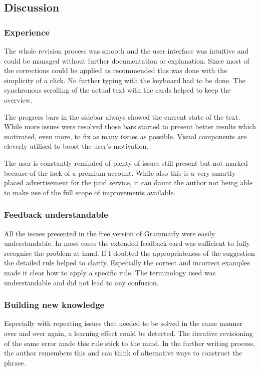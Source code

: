 \documentclass[runningheads]{llncs}
\let\OldTextregistered\textregistered
\renewcommand{\textregistered}{\OldTextregistered\xspace}
\begin{document}
\subsection{Discussion}
\subsubsection{Experience}
The whole revision process was smooth and the user interface was intuitive and could be managed without further documentation or explanation. Since most of the corrections could be applied as recommended this was done with the simplicity of a click. No further typing with the keyboard had to be done. The synchronous scrolling of the actual text with the cards helped to keep the overview.

The progress bars in the sidebar always showed the current state of the text. While more issues were resolved those bars started to present better results which motivated, even more, to fix as many issues as possible. Visual components are cleverly utilised to boost the user's motivation.

The user is constantly reminded of plenty of issues still present but not marked because of the lack of a premium account. While also this is a very smartly placed advertisement for the paid service, it can daunt the author not being able to make use of the full scope of improvements available.

\subsubsection{Feedback understandable}
All the issues presented in the free version of Grammarly\textregistered were easily understandable. In most cases the extended feedback card was sufficient to fully recognise the problem at hand. If I doubted the appropriateness of the suggestion the detailed rule helped to clarify. Especially the correct and incorrect examples made it clear how to apply a specific rule. The terminology used was understandable and did not lead to any confusion.

\subsubsection{Building new knowledge}
Especially with repeating issues that needed to be solved in the same manner over and over again, a learning effect could be detected. The iterative revisioning of the same error made this rule stick to the mind. In the further writing process, the author remembers this and can think of alternative ways to construct the phrase.
\end{document}
